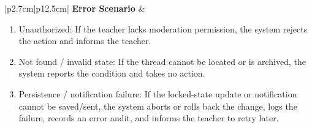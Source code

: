 \begin{table}[H]
\begin{tabular}{|p{2.7cm}|p{12.5cm}|}
        \textbf{Error Scenario} & \begin{minipage}[t]{\linewidth}
            \begin{enumerate}[topsep=0pt,itemsep=1pt,parsep=0pt,partopsep=0pt]
                \item Unauthorized: If the teacher lacks moderation permission, the system rejects the action and informs the teacher.
                \item Not found / invalid state: If the thread cannot be located or is archived, the system reports the condition and takes no action.
                \item Persistence / notification failure: If the locked-state update or notification cannot be saved/sent, the system aborts or rolls back the change, logs the failure, records an error audit, and informs the teacher to retry later.
            \end{enumerate}
        \end{minipage} \\ \hline
    \end{tabular}
    \label{tab:teacher-lock-unlock-thread}
\end{table}
\fi
\iffalse
{}
